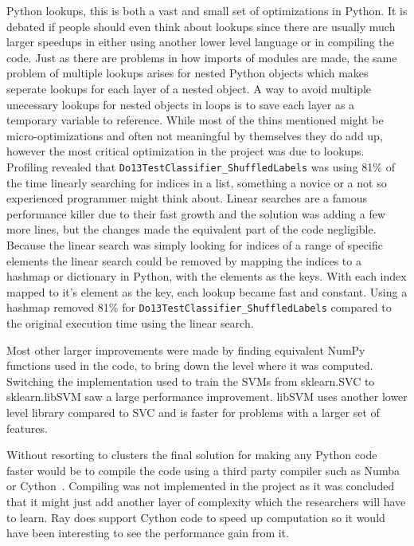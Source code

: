 \documentclass[12pt, a4paper]{article}
\begin{document}
Python lookups, this is both a vast and small set of optimizations in Python.
It is debated if people should even think about lookups since there are usually much larger speedups in either using another lower level language or in compiling the code.
Just as there are problems in how imports of modules are made, the same problem of multiple lookups arises for nested Python objects which makes seperate lookups for each layer of a nested object.
A way to avoid multiple unecessary lookups for nested objects in loops is to save each layer as a temporary variable to reference.
While most of the thins mentioned might be micro-optimizations and often not meaningful by themselves they do add up, however the most critical optimization in the project was due to lookups.
Profiling revealed that \texttt{Do13TestClassifier\_ShuffledLabels} was using 81\% of the time linearly searching for indices in a list, something a novice or a not so experienced programmer might think about.
Linear searches are a famous performance killer due to their fast growth and the solution was adding a few more lines, but the changes made the equivalent part of the code negligible.
Because the linear search was simply looking for indices of a range of specific elements the linear search could be removed by mapping the indices to a hashmap or dictionary in Python, with the elements as the keys.
With each index mapped to it's element as the key, each lookup became fast and constant.
Using a hashmap removed 81\% for \texttt{Do13TestClassifier\_ShuffledLabels} compared to the original execution time using the linear search.

Most other larger improvements were made by finding equivalent NumPy functions used in the code, to bring down the level where it was computed.
Switching the implementation used to train the SVMs from sklearn.SVC to sklearn.libSVM saw a large performance improvement.
libSVM uses another lower level library compared to SVC and is faster for problems with a larger set of features.

Without resorting to clusters the final solution for making any Python code faster would be to compile the code using a third party compiler such as Numba or Cython~\cite{matEval}.
Compiling was not implemented in the project as it was concluded that it might just add another layer of complexity which the researchers will have to learn.
Ray does support Cython code to speed up computation so it would have been interesting to see the performance gain from it.
\end{document}
